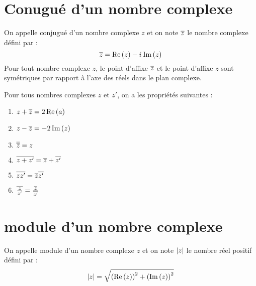 \section{Conugué d'un nombre complexe}
\begin{defi}
	On appelle conjugué d’un nombre complexe \(z\) et on note \(\overline{z}\) le nombre complexe défini par : \[\overline{z} = \operatorname{Re}\left(z\right) -i\mkern1mu \operatorname{Im}\left(z\right)\]
	Pour tout nombre complexe \(z\), le point d’affixe \(\overline{z}\) et le point d’affixe \(z\) sont symétriques par rapport à l’axe des réels dans le plan complexe.
\end{defi}

\begin{defprop}
	Pour tous nombres complexes \(z\) et \(z'\), on a les propriétés suivantes :
	\begin{enumerate}
		\item \(z+\overline{z} = 2 \operatorname{Re}\left(a\right)\)\\
		\item \(z-\overline{z} = -2 \operatorname{Im}\left(z\right)\) \\
		\item \(\overline{\overline{z}} = z \)\\
		\item \(\overline{z+z'} = \overline{z}+\overline{z'}\)\\
		\item \(\overline{zz'} = \overline{z} \overline{z'} \)\\
		\item \(\overline{\frac{z}{z'}} = \frac{\overline{z}}{\overline{z'}}\)
	\end{enumerate}
\end{defprop}

\section{module d'un nombre complexe}
\begin{defprop}
	On appelle module d’un nombre complexe \(z\) et on note \(\left\lvert z\right\rvert\) le nombre réel positif défini par : \[\left\lvert z\right\rvert = \sqrt{ \left(\operatorname{Re}\left(z\right)\right)^2+\left(\operatorname{Im}\left(z\right)\right)^2}\]
\end{defprop}

